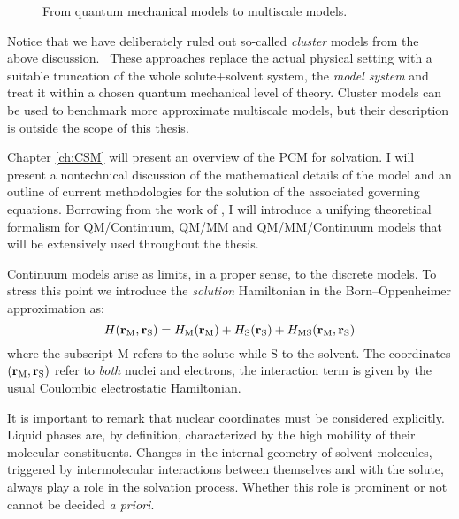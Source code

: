 \begin{figure}[tb]
\caption{From quantum mechanical models to multiscale models.}
\label{fig:qm-to-multiscale}
\end{figure}

Notice that we have deliberately ruled out so-called \emph{cluster}
models from the above discussion.~\autocite{ClusterModels}
These approaches replace the actual physical setting with a suitable
truncation of the whole solute+solvent system, the \emph{model system}
and treat it within a chosen quantum mechanical level of theory.
Cluster models can be used to benchmark more approximate multiscale
models, but their description is outside the scope of this thesis.

Chapter \ref{ch:CSM} will present an overview of the \ac{PCM} for
solvation.
I will present a nontechnical discussion of the mathematical details of
the model and an outline of current methodologies for the solution of
the associated governing equations.
Borrowing from the work of \citeauthor{Lipparini2010-be},\autocite{Lipparini2010-be,
Lipparini2015-lq} I will introduce a unifying theoretical formalism for
\acs{QM}/Continuum, \acs{QM}/\acs{MM} and \acs{QM}/\acs{MM}/Continuum models that will
be extensively used throughout the thesis.


Continuum models arise as limits, in a proper sense, to the discrete
models. To stress this point we introduce the \emph{solution}
Hamiltonian in the Born--Oppenheimer approximation as:
\begin{equation}\label{eq:solution-ham}
 H(\mathbf{r}_\mathrm{M}, \mathbf{r}_\mathrm{S}) =
  H_\mathrm{M}(\mathbf{r}_\mathrm{M}) +  H_\mathrm{S}(\mathbf{r}_\mathrm{S})
+ H_\mathrm{MS}(\mathbf{r}_\mathrm{M}, \mathbf{r}_\mathrm{S})
\end{equation}
where the subscript M refers to the solute while S to the solvent. The
coordinates $(\mathbf{r}_\mathrm{M}, \mathbf{r}_\mathrm{S})$ refer to
\emph{both} nuclei and electrons, the interaction term is given by the
usual Coulombic electrostatic Hamiltonian.

It is important to remark that nuclear coordinates must be considered
explicitly. Liquid phases are, by definition, characterized by the high
mobility of their molecular constituents. Changes in the internal
geometry of solvent molecules, triggered by intermolecular interactions
between themselves and with the solute, always play a role in the
solvation process. Whether this role is prominent or not cannot be
decided \emph{a priori}.

